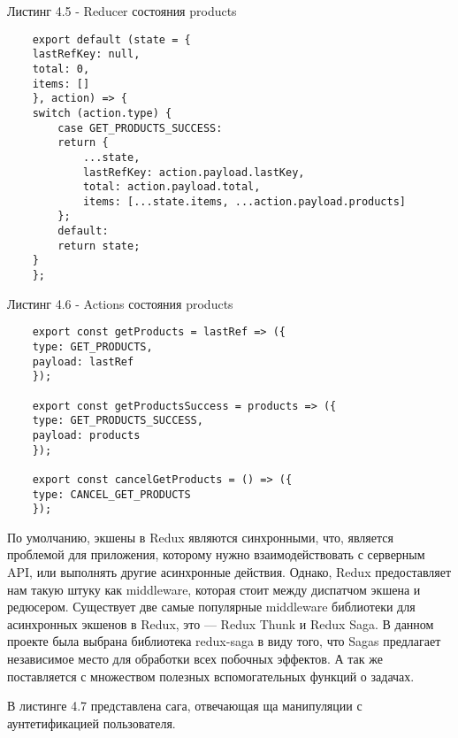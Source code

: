 Листинг 4.5 - Reducer состояния products
\begin{lstlisting}
    export default (state = {
    lastRefKey: null,
    total: 0,
    items: []
    }, action) => {
    switch (action.type) {
        case GET_PRODUCTS_SUCCESS:
        return {
            ...state,
            lastRefKey: action.payload.lastKey,
            total: action.payload.total,
            items: [...state.items, ...action.payload.products]
        };
        default:
        return state;
    }
    };
\end{lstlisting}

Листинг 4.6 - Actions состояния products
\begin{lstlisting}
    export const getProducts = lastRef => ({
    type: GET_PRODUCTS,
    payload: lastRef
    });

    export const getProductsSuccess = products => ({
    type: GET_PRODUCTS_SUCCESS,
    payload: products
    });

    export const cancelGetProducts = () => ({
    type: CANCEL_GET_PRODUCTS
    });

\end{lstlisting}

По умолчанию, экшены в Redux являются синхронными, что, является проблемой для приложения, которому нужно взаимодействовать с серверным API, или выполнять другие асинхронные действия.
Однако, Redux предоставляет нам такую штуку как middleware, которая стоит между диспатчом экшена и редюсером.
Существует две самые популярные middleware библиотеки для асинхронных экшенов в Redux, это — Redux Thunk и Redux Saga.
В данном проекте была выбрана библиотека redux-saga в виду того, что Sagas предлагает независимое место для обработки всех побочных эффектов.
А так же поставляется с множеством полезных вспомогательных функций о задачах.

В листинге 4.7 представлена сага, отвечающая ща манипуляции с аунтетификацией пользователя.

